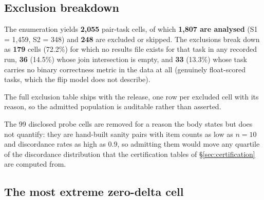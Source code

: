 \subsection{Exclusion breakdown}
\label{app:atlas:exclusions}

The enumeration yields \textbf{2{,}055} pair-task cells, of which
\textbf{1{,}807 are analysed} (S1 = 1{,}459, S2 = 348) and \textbf{248} are
excluded or skipped. The exclusions break down as \textbf{179} cells (72.2\%)
for which no results file exists for that task in any recorded run,
\textbf{36} (14.5\%) whose join intersection is empty, and \textbf{33}
(13.3\%) whose task carries no binary correctness metric in the data at all
(genuinely float-scored tasks, which the flip model does not describe).

The full exclusion table ships with the release, one row per excluded cell with
its reason, so the admitted population is auditable rather than asserted.

The 99 disclosed probe cells are removed for a reason the body states but does
not quantify: they are hand-built sanity pairs with item counts as low as
$n = 10$ and discordance rates as high as $0.9$, so admitting them would move
any quartile of the discordance distribution that the certification tables of
\S\ref{sec:certification} are computed from.

\subsection{The most extreme zero-delta cell}
\label{app:atlas:extreme}

